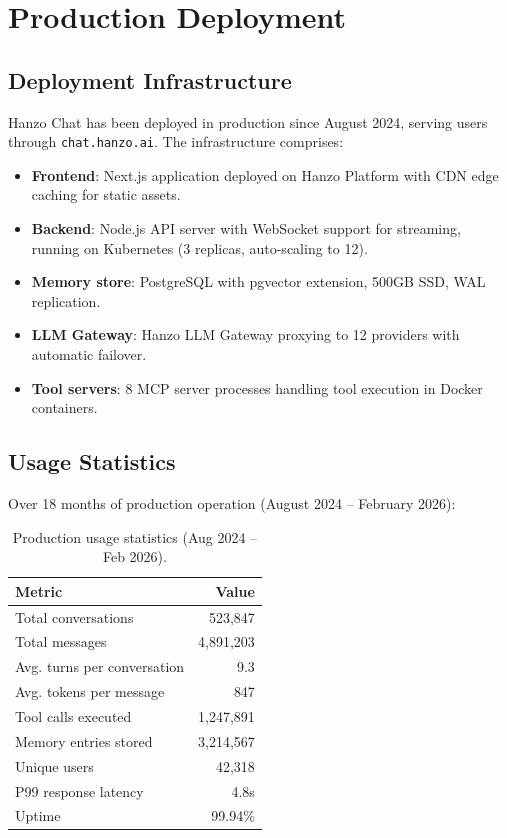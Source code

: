 \section{Production Deployment}

\label{sec:production}

\subsection{Deployment Infrastructure}

Hanzo Chat has been deployed in production since August 2024, serving users through \texttt{chat.hanzo.ai}. The infrastructure comprises:

\begin{itemize}[leftmargin=1.1em]
    \item \textbf{Frontend}: Next.js application deployed on Hanzo Platform with CDN edge caching for static assets.
    \item \textbf{Backend}: Node.js API server with WebSocket support for streaming, running on Kubernetes (3 replicas, auto-scaling to 12).
    \item \textbf{Memory store}: PostgreSQL with pgvector extension, 500GB SSD, WAL replication.
    \item \textbf{LLM Gateway}: Hanzo LLM Gateway proxying to 12 providers with automatic failover.
    \item \textbf{Tool servers}: 8 MCP server processes handling tool execution in Docker containers.
\end{itemize}

\subsection{Usage Statistics}

Over 18 months of production operation (August 2024 -- February 2026):

\begin{table}[H]
\centering
\begin{tabular}{lr}
\toprule
\textbf{Metric} & \textbf{Value} \\
\midrule
Total conversations & 523,847 \\
Total messages & 4,891,203 \\
Avg. turns per conversation & 9.3 \\
Avg. tokens per message & 847 \\
Tool calls executed & 1,247,891 \\
Memory entries stored & 3,214,567 \\
Unique users & 42,318 \\
P99 response latency & 4.8s \\
Uptime & 99.94\% \\
\bottomrule
\end{tabular}
\caption{Production usage statistics (Aug 2024 -- Feb 2026).}
\label{tab:production}
\end{table}

